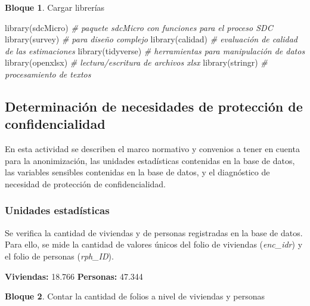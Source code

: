 \documentclass[
]{book}
\newenvironment{Shaded}{\begin{snugshade}}{\end{snugshade}}
\newcommand{\CommentTok}[1]{\textcolor[rgb]{0.56,0.35,0.01}{\textit{#1}}}
\newcommand{\FunctionTok}[1]{\textcolor[rgb]{0.00,0.00,0.00}{#1}}
\newcommand{\NormalTok}[1]{#1}
\theoremstyle{definition}
\theoremstyle{definition}
\newtheorem{example}{Bloque}[chapter]
\theoremstyle{definition}
\theoremstyle{definition}
\theoremstyle{remark}
\begin{document}
\begin{example}
\protect\hypertarget{exm:bloque5nbm}{}\label{exm:bloque5nbm}Cargar librerías
\end{example}

\begin{Shaded}
\begin{Highlighting}[]
\FunctionTok{library}\NormalTok{(sdcMicro)  }\CommentTok{\# paquete sdcMicro con funciones para el proceso SDC}
\FunctionTok{library}\NormalTok{(survey)    }\CommentTok{\# para diseño complejo}
\FunctionTok{library}\NormalTok{(calidad)   }\CommentTok{\# evaluación de calidad de las estimaciones}
\FunctionTok{library}\NormalTok{(tidyverse) }\CommentTok{\# herramientas para manipulación de datos}
\FunctionTok{library}\NormalTok{(openxlsx)  }\CommentTok{\# lectura/escritura de archivos xlsx}
\FunctionTok{library}\NormalTok{(stringr) }\CommentTok{\# procesamiento de textos}
\end{Highlighting}
\end{Shaded}

\hypertarget{determinaciuxf3n-de-necesidades-de-protecciuxf3n-de-confidencialidad}{%
\subsection{Determinación de necesidades de protección de confidencialidad}\label{determinaciuxf3n-de-necesidades-de-protecciuxf3n-de-confidencialidad}}

En esta actividad se describen el marco normativo y convenios a tener en cuenta para la anonimización, las unidades estadísticas contenidas en la base de datos, las variables sensibles contenidas en la base de datos, y el diagnóstico de necesidad de protección de confidencialidad.

\hypertarget{unidades-estaduxedsticas}{%
\subsubsection{Unidades estadísticas}\label{unidades-estaduxedsticas}}

Se verifica la cantidad de viviendas y de personas registradas en la base de datos. Para ello, se mide la cantidad de valores únicos del folio de viviendas (\emph{enc\_idr}) y el folio de personas (\emph{rph\_ID}).

\textbf{Viviendas:} 18.766
\textbf{Personas:} 47.344

\begin{example}
\protect\hypertarget{exm:bloque6nbm}{}\label{exm:bloque6nbm}Contar la cantidad de folios a nivel de viviendas y personas
\end{example}
\end{document}
